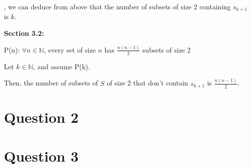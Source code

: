 \documentclass[12pt]{article}
\begin{document}
\begin{enumerate}[a.]
    \bigskip

    , we can deduce from above that the number of subsets of size 2 containing
    $s_{k+1}$ is $k$.

    \bigskip

    \textbf{Section 3.2:}

    \bigskip

    P(n): $\forall n \in \mathbb{N}$, every set of size $n$ has $\frac{n(n-1)}{2}$
    subsets of size 2

    \bigskip

    Let $k \in \mathbb{N}$, and assume P(k).

    \bigskip

    Then, the number of subsets of $S$ of size 2 that don't contain $s_{k+1}$ is
    $\frac{n(n-1)}{2}$.


\end{enumerate}

\section*{Question 2}

\section*{Question 3}
\end{document}

